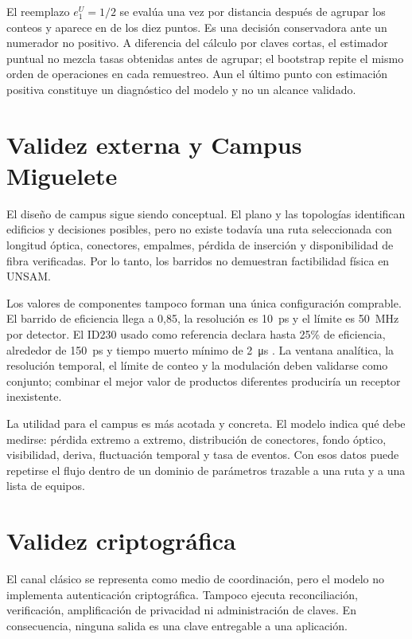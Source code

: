 El reemplazo \(e_1^U=1/2\) se evalúa una vez por distancia después de agrupar los conteos y aparece en \PThreeDecoyFallbackDistances{} de los diez puntos. Es una decisión conservadora ante un numerador no positivo. A diferencia del cálculo por claves cortas, el estimador puntual no mezcla tasas obtenidas antes de agrupar; el bootstrap repite el mismo orden de operaciones en cada remuestreo. Aun el último punto con estimación positiva constituye un diagnóstico del modelo y no un alcance validado.

\section{Validez externa y Campus Miguelete}

El diseño de campus sigue siendo conceptual. El plano y las topologías identifican edificios y decisiones posibles, pero no existe todavía una ruta seleccionada con longitud óptica, conectores, empalmes, pérdida de inserción y disponibilidad de fibra verificadas. Por lo tanto, los barridos no demuestran factibilidad física en UNSAM.

Los valores de componentes tampoco forman una única configuración comprable. El barrido de eficiencia llega a 0,85, la resolución es \SI{10}{\pico\second} y el límite es \SI{50}{\mega\hertz} por detector. El ID230 usado como referencia declara hasta 25\% de eficiencia, alrededor de \SI{150}{\pico\second} y tiempo muerto mínimo de \SI{2}{\micro\second} \cite{idqID230}. La ventana analítica, la resolución temporal, el límite de conteo y la modulación deben validarse como conjunto; combinar el mejor valor de productos diferentes produciría un receptor inexistente.

La utilidad para el campus es más acotada y concreta. El modelo indica qué debe medirse: pérdida extremo a extremo, distribución de conectores, fondo óptico, visibilidad, deriva, fluctuación temporal y tasa de eventos. Con esos datos puede repetirse el flujo dentro de un dominio de parámetros trazable a una ruta y a una lista de equipos.

\section{Validez criptográfica}

El canal clásico se representa como medio de coordinación, pero el modelo no implementa autenticación criptográfica. Tampoco ejecuta reconciliación, verificación, amplificación de privacidad ni administración de claves. En consecuencia, ninguna salida es una clave entregable a una aplicación.

